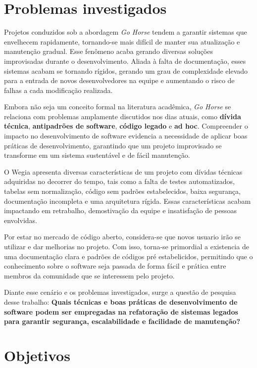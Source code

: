     \section{Problemas investigados}

    Projetos conduzidos sob a abordagem \textit{Go Horse} tendem a garantir sistemas que envelhecem rapidamente, tornando-se mais difícil de manter sua atualização e manutenção gradual. Esse fenômeno acaba gerando diversas soluções improvisadas durante o desenvolvimento. Aliada à falta de documentação, esses sistemas acabam se tornando rígidos, gerando um grau de complexidade elevado para a entrada de novos desenvolvedores na equipe e aumentando o risco de falhas a cada modificação realizada.
    
    Embora não seja um conceito formal na literatura acadêmica,  \textit{Go Horse} se relaciona com problemas amplamente discutidos nos dias atuais, como \textbf{dívida técnica}, \textbf{antipadrões de software}, \textbf{código legado} e \textbf{ad hoc}. Compreender o impacto no desenvolvimento de software evidencia a necessidade de aplicar boas práticas de desenvolvimento, garantindo que um projeto improvisado se transforme em um sistema sustentável e de fácil manutenção.

    O Wegia apresenta diversas características de um projeto com dívidas técnicas adquiridas no decorrer do tempo, tais como a falta de testes automatizados, tabelas sem normalização, código sem padrões estabelecidos, baixa segurança, documentação incompleta e uma arquitetura rígida. Essas características acabam impactando em retrabalho, demostivação da equipe e insatisfação de pessoas envolvidas.\cite[]{borges2022investigaccao}
    
    Por estar no mercado de código aberto, considera-se que novos usuario irão se utilizar e dar melhorias no projeto. Com isso, torna-se primordial a existencia de uma documentação clara e padrões de códigos pré estabelicidos, permitindo que o conhecimento sobre o software seja passada de forma fácil e prática entre membros da comunidade que se interessem pelo projeto.\cite[]{souza2010contribuiccao}

    Diante esse cenário e os problemas investigados, surge a questão de pesquisa desse trabalho: \textbf{Quais técnicas e boas práticas de desenvolvimento de software podem ser empregadas na refatoração de sistemas legados para garantir segurança, escalabilidade e facilidade de manutenção?}
        
    \section{Objetivos}
    \label{subsec:objetivos}

